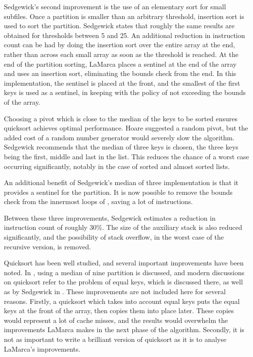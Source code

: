 Sedgewick's second improvement is the use of an elementary sort for small
subfiles.  Once a partition is smaller than an arbitrary threshold, insertion
sort is used to sort the partition. Sedgewick states that roughly the same
results are obtained for thresholds between 5 and 25. An additional reduction in
instruction count can be had by doing the insertion sort over the entire array
at the end, rather than across each small array as soon as the threshold is
reached. At the end of the partition sorting, LaMarca places a sentinel at the
end of the array and uses an insertion sort, eliminating the bounds check from
the end. In this implementation, the sentinel is placed at the front, and the
smallest of the first  keys is used as a sentinel, in keeping
with the policy of not exceeding the bounds of the array.

Choosing a pivot which is close to the median of the keys to be sorted ensures
quicksort achieves optimal performance. Hoare suggested a random pivot, but the
added cost of a random number generator would severely slow the algorithm.
Sedgewick recommends that the median of three keys is chosen, the three keys
being the first, middle and last in the list. This reduces the chance of a worst
case occurring significantly, notably in the case of sorted and almost sorted
lists.

An additional benefit of Sedgewick's median of three implementation is that it
provides a sentinel for the partition. It is now possible to remove the bounds
check from the innermost loops of , saving a lot of instructions.

Between these three improvements, Sedgewick estimates a reduction in
instruction count of roughly 30\%. The size of the auxiliary stack is also
reduced significantly, and the possibility of stack overflow, in the worst case
of the recursive version, is removed.

Quicksort has been well studied, and several important improvements have been
noted. In \cite{BentleyMcIlroy93}, using a median of nine partition is discussed,
and modern discussions on quicksort refer to the problem of equal keys, which is
discussed there, as well as by Sedgewick in \cite{SedgewickBentley02}. These
improvements are not included here for several reasons. Firstly, a quicksort
which takes into account equal keys puts the equal keys at the front of the
array, then copies them into place later. These copies would represent a lot of
cache misses, and the results would overwhelm the improvements LaMarca makes in
the next phase of the algorithm. Secondly, it is not as important to write a
brilliant version of quicksort as it is to analyse LaMarca's improvements.

